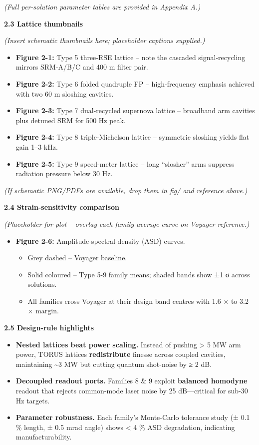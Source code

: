 \documentclass[]{article}
\begin{document}
\emph{(Full per-solution parameter tables are provided in Appendix A.)}

\textbf{2.3 Lattice thumbnails}

\emph{(Insert schematic thumbnails here; placeholder captions
supplied.)}

\begin{itemize}
\item
  \textbf{Figure 2-1:} Type 5 three-RSE lattice -- note the cascaded
  signal-recycling mirrors SRM-A/B/C and 400 m filter pair.
\item
  \textbf{Figure 2-2:} Type 6 folded quadruple FP -- high-frequency
  emphasis achieved with two 60 m sloshing cavities.
\item
  \textbf{Figure 2-3:} Type 7 dual-recycled supernova lattice --
  broadband arm cavities plus detuned SRM for 500 Hz peak.
\item
  \textbf{Figure 2-4:} Type 8 triple-Michelson lattice -- symmetric
  sloshing yields flat gain 1--3 kHz.
\item
  \textbf{Figure 2-5:} Type 9 speed-meter lattice -- long ``slosher''
  arms suppress radiation pressure below 30 Hz.
\end{itemize}

\emph{(If schematic PNG/PDFs are available, drop them in fig/ and
reference above.)}

\textbf{2.4 Strain-sensitivity comparison}

\emph{(Placeholder for plot -- overlay each family-average curve on
Voyager reference.)}

\begin{itemize}
\item
  \textbf{Figure 2-6:} Amplitude-spectral-density (ASD) curves.

  \begin{itemize}
  \item
    Grey dashed -- Voyager baseline.
  \item
    Solid coloured -- Type 5-9 family means; shaded bands show ±1 σ
    across solutions.
  \item
    All families cross Voyager at their design band centres with 1.6 ×
    to 3.2 × margin.
  \end{itemize}
\end{itemize}

\textbf{2.5 Design-rule highlights}

\begin{itemize}
\item
  \textbf{Nested lattices beat power scaling.} Instead of pushing
  \textgreater{} 5 MW arm power, TORUS lattices \textbf{redistribute}
  finesse across coupled cavities, maintaining \textasciitilde{}3 MW but
  cutting quantum shot-noise by ≥ 2 dB.
\item
  \textbf{Decoupled readout ports.} Families 8 \& 9 exploit
  \textbf{balanced homodyne} readout that rejects common-mode laser
  noise by 25 dB---critical for sub-30 Hz targets.
\item
  \textbf{Parameter robustness.} Each family's Monte-Carlo tolerance
  study (± 0.1 \% length, ± 0.5 mrad angle) shows \textless{} 4 \% ASD
  degradation, indicating manufacturability.
\end{itemize}
\end{document}
